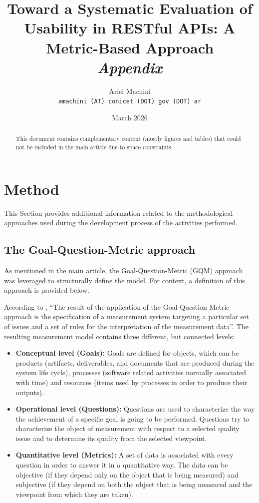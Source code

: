\documentclass[12pt]{article}
\title{
	Toward a Systematic Evaluation of Usability in RESTful APIs: A Metric-Based Approach\\
	{\Large \textit{Appendix}}
}
\author{
	Ariel Machini\\
	{\small \texttt{amachini (AT) conicet (DOT) gov (DOT) ar}}
}
\date{March 2026}
\begin{document}
	
	\maketitle
	
	\begin{abstract}
		This document contains complementary content (mostly figures and tables) that could not be included in the main article due to space constraints.
	\end{abstract}
	
	\section{Method}
	
	This Section provides additional information related to the methodological approaches used during the development process of the activities performed.
	
	\subsection{The Goal-Question-Metric approach}
	
	As mentioned in the main article, the Goal-Question-Metric (GQM) approach was leveraged to structurally define the model. For context, a definition of this approach is provided below.
	
	According to \cite{Basili-1994}, ``The result of the application of the Goal Question Metric approach is the specification of a measurement system targeting a particular set of issues and a set of rules for the interpretation of the measurement data''. The resulting measurement model contains three different, but connected levels:
	
	\begin{itemize}
		\item \textbf{Conceptual level (Goals):} Goals are defined for objects, which can be products (artifacts, deliverables, and documents that are produced during the system life cycle), processes (software related activities normally associated with time) and resources (items used by processes in order to produce their outputs).
		\item \textbf{Operational level (Questions):} Questions are used to characterize the way the achievement of a specific goal is going to be performed. Questions try to characterize the object of measurement with respect to a selected quality issue and to determine its quality from the selected viewpoint.
		\item \textbf{Quantitative level (Metrics):} A set of data is associated with every question in order to answer it in a quantitative way. The data can be objective (if they depend only on the object that is being measured) and subjective (if they depend on both the object that is being measured and the viewpoint from which they are taken).
	\end{itemize}
	
\end{document}
